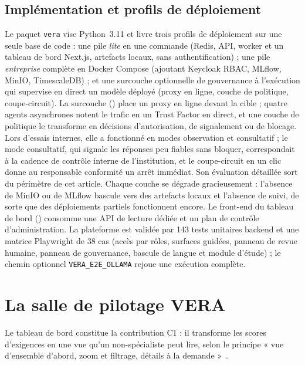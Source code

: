 \documentclass[10pt,conference]{IEEEtran}
\begin{document}
\subsection{Implémentation et profils de déploiement}
Le paquet \texttt{vera} vise Python~3.11 et livre trois profils de déploiement sur une seule base de code : une pile \emph{lite} en une commande (Redis, API, worker et un tableau de bord Next.js, artefacts locaux, sans authentification) ; une pile \emph{entreprise} complète en Docker Compose (ajoutant Keycloak RBAC, MLflow, MinIO, TimescaleDB) ; et une surcouche optionnelle de gouvernance à l'exécution qui supervise en direct un modèle déployé (proxy en ligne, couche de politique, coupe-circuit).
La surcouche () place un proxy en ligne devant la cible ; quatre agents asynchrones notent le trafic en un Trust Factor en direct, et une couche de politique le transforme en décisions d'autorisation, de signalement ou de blocage.
Lors d'essais internes, elle a fonctionné en modes observation et consultatif ; le mode consultatif, qui signale les réponses peu fiables sans bloquer, correspondait à la cadence de contrôle interne de l'institution, et le coupe-circuit en un clic donne au responsable conformité un arrêt immédiat.
Son évaluation détaillée sort du périmètre de cet article.
Chaque couche se dégrade gracieusement : l'absence de MinIO ou de MLflow bascule vers des artefacts locaux et l'absence de suivi, de sorte que des déploiements partiels fonctionnent encore.
Le front-end du tableau de bord () consomme une API de lecture dédiée et un plan de contrôle d'administration.
La plateforme est validée par 143 tests unitaires backend et une matrice Playwright de 38 cas (accès par rôles, surfaces guidées, panneau de revue humaine, panneau de gouvernance, bascule de langue et module d'étude) ; le chemin optionnel \texttt{VERA\_E2E\_OLLAMA} rejoue une exécution complète.

\section{La salle de pilotage VERA}
\label{sec:dashboard}
Le tableau de bord constitue la contribution C1 : il transforme les scores d'exigences en une vue qu'un non-spécialiste peut lire, selon le principe « vue d'ensemble d'abord, zoom et filtrage, détails à la demande »~\cite{shneiderman1996eyes}.
\end{document}
